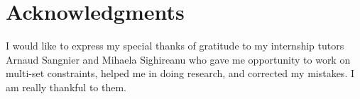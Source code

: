 
\section*{Acknowledgments}
I would like to express my special thanks of gratitude to my internship tutors Arnaud Sangnier and Mihaela Sighireanu 
who gave me opportunity to work on multi-set constraints, 
helped me in doing research, and corrected my mistakes.
I am really thankful to them.
